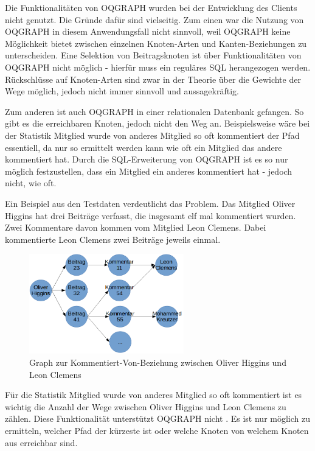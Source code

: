 Die Funktionalitäten von OQGRAPH wurden bei der Entwicklung des Clients nicht genutzt. Die Gründe dafür sind vielseitig. Zum einen war die Nutzung von OQGRAPH in diesem Anwendungsfall nicht sinnvoll, weil OQGRAPH keine Möglichkeit bietet zwischen einzelnen Knoten-Arten und Kanten-Beziehungen zu unterscheiden. Eine Selektion von Beitragsknoten ist über Funktionalitäten von OQGRAPH nicht möglich - hierfür muss ein reguläres SQL herangezogen werden. Rückschlüsse auf Knoten-Arten sind zwar in der Theorie über die Gewichte der Wege möglich, jedoch nicht immer sinnvoll und aussagekräftig.

Zum anderen ist auch OQGRAPH in einer relationalen Datenbank \grqq gefangen\grqq{}. So gibt es die erreichbaren Knoten, jedoch nicht den Weg an. Beispielsweise wäre bei der Statistik \grqq Mitglied wurde von anderes Mitglied so oft kommentiert\grqq{} der Pfad essentiell, da nur so ermittelt werden kann wie oft ein Mitglied das andere kommentiert hat. Durch die SQL-Erweiterung von OQGRAPH ist es so nur möglich festzustellen, dass ein Mitglied ein anderes kommentiert hat - jedoch nicht, wie oft.

Ein Beispiel aus den Testdaten verdeutlicht das Problem. Das Mitglied \grqq Oliver Higgins\grqq{} hat drei Beiträge verfasst, die insgesamt elf mal kommentiert wurden. Zwei Kommentare davon kommen vom Mitglied \grqq Leon Clemens\grqq{}. Dabei kommentierte Leon Clemens zwei Beiträge jeweils einmal.

\begin{figure}[h]
	\centering
	\includegraphics[width=0.6\textwidth]{images/graph.png}
	\caption{Graph zur Kommentiert-Von-Beziehung zwischen Oliver Higgins und Leon Clemens}
\end{figure}

Für die Statistik \grqq Mitglied wurde von anderes Mitglied so oft kommentiert\grqq{} ist es wichtig die Anzahl der Wege zwischen Oliver Higgins und Leon Clemens zu zählen. Diese Funktionalität unterstützt OQGRAPH nicht \cite{OQGRAPH-Examples}. Es ist nur möglich zu ermitteln, welcher Pfad der kürzeste ist oder welche Knoten von welchem Knoten aus erreichbar sind.

